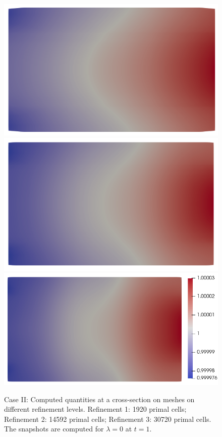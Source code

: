 \documentclass{article}
\begin{document}
\begin{figure}
\begin{minipage}{0.9\textwidth}
    \hspace{0.04cm}
    \includegraphics[scale=0.27]{slice_ni_T-1_lambda-0_8-2-2.png}\hspace{0.04cm}
    \includegraphics[scale=0.27]{slice_ni_T-1_lambda-0_16-3-3.png}\hspace{0.04cm}
    \includegraphics[scale=0.27]{slice_ni_T-1_lambda-0_32-3-4.png}
    \end{minipage}
    
    \caption{Case II: Computed quantities at a cross-section on meshes on different
      refinement levels. Refinement 1: 1920 primal cells; Refinement 2: 14592 primal
      cells; Refinement 3: 30720 primal cells. The snapshots are computed for
      \colorbox{yellow!30}{$\lambda = 0$} at $t = 1$.}
    \label{fig:grid_study_3d_clip_lambda-0}
\end{figure}
\fi
\end{document}
